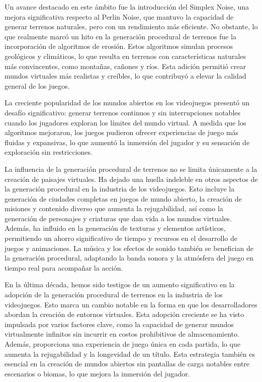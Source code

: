 Un avance destacado en este ámbito fue la introducción del Simplex Noise, una mejora significativa respecto al Perlin Noise, que mantuvo la capacidad de generar terrenos naturales, pero con un rendimiento más eficiente. No obstante, lo que realmente marcó un hito en la generación procedural de terrenos fue la incorporación de algoritmos de erosión. Estos algoritmos simulan procesos geológicos y climáticos, lo que resulta en terrenos con características naturales más convincentes, como montañas, cañones y ríos. Esta adición permitió crear mundos virtuales más realistas y creíbles, lo que contribuyó a elevar la calidad general de los juegos.

La creciente popularidad de los mundos abiertos en los videojuegos presentó un desafío significativo: generar terrenos continuos y sin interrupciones notables cuando los jugadores exploran los límites del mundo virtual. A medida que los algoritmos mejoraron, los juegos pudieron ofrecer experiencias de juego más fluidas y expansivas, lo que aumentó la inmersión del jugador y su sensación de exploración sin restricciones.

La influencia de la generación procedural de terrenos no se limita únicamente a la creación de paisajes virtuales. Ha dejado una huella indeleble en otros aspectos de la generación procedural en la industria de los videojuegos. Esto incluye la generación de ciudades completas en juegos de mundo abierto, la creación de misiones y contenido diverso que aumenta la rejugabilidad, así como la generación de personajes y criaturas que dan vida a los mundos virtuales. Además, ha influido en la generación de texturas y elementos artísticos, permitiendo un ahorro significativo de tiempo y recursos en el desarrollo de juegos y animaciones. La música y los efectos de sonido también se benefician de la generación procedural, adaptando la banda sonora y la atmósfera del juego en tiempo real para acompañar la acción.

En la última década, hemos sido testigos de un aumento significativo en la adopción de la generación procedural de terrenos en la industria de los videojuegos. Esto marca un cambio notable en la forma en que los desarrolladores abordan la creación de entornos virtuales. Esta adopción creciente se ha visto impulsada por varios factores clave, como la capacidad de generar mundos virtualmente infinitos sin incurrir en costos prohibitivos de almacenamiento. Además, proporciona una experiencia de juego única en cada partida, lo que aumenta la rejugabilidad y la longevidad de un título. Esta estrategia también es esencial en la creación de mundos abiertos sin pantallas de carga notables entre escenarios o biomas, lo que mejora la inmersión del jugador.

